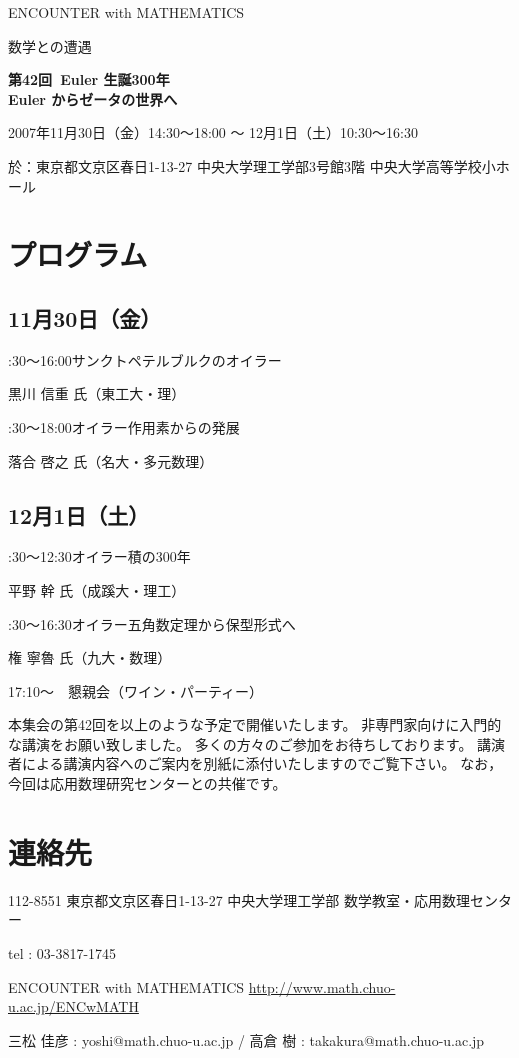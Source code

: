 \documentclass[uplatex,dvipdfmx]{jlreq}
\newcommand{\talk}[3]{%
\noindent
#1\quad #2\par
\hspace*{2em}#3\par\smallskip
}
\newcommand{\EwMnumber}{第42回}
\newcommand{\EwMtitle}{Euler 生誕300年\\[2mm]\large Euler からゼータの世界へ}
\newcommand{\EwMdate}{2007年11月30日（金）14:30～18:00 ～ 12月1日（土）10:30～16:30}
\newcommand{\EwMplace}{東京都文京区春日1-13-27 中央大学理工学部3号館3階 中央大学高等学校小ホール}
\newcommand{\EwMtitleblock}{
\vspace*{-5mm}
\begin{center}
{\Large ENCOUNTER with MATHEMATICS}

\vspace{2mm}
{\large 数学との遭遇}

\vspace{4mm}
{\Large \bfseries \EwMnumber\ \EwMtitle}

\vspace{4mm}
\EwMdate

\vspace{2mm}
於：\EwMplace
\end{center}

\vspace{2mm}
}
\begin{document}
\EwMtitleblock

\section*{プログラム}

\subsection*{11月30日（金）}

\talk
{14:30～16:00}
{サンクトペテルブルクのオイラー}
{黒川 信重 氏（東工大・理）}

\talk
{16:30～18:00}
{オイラー作用素からの発展}
{落合 啓之 氏（名大・多元数理）}

\subsection*{12月1日（土）}

\talk
{10:30～12:30}
{オイラー積の300年}
{平野 幹 氏（成蹊大・理工）}

\talk
{14:30～16:30}
{オイラー五角数定理から保型形式へ}
{権 寧魯 氏（九大・数理）}

\bigskip

17:10～　懇親会（ワイン・パーティー）

\bigskip

本集会の第42回を以上のような予定で開催いたします。  
非専門家向けに入門的な講演をお願い致しました。  
多くの方々のご参加をお待ちしております。  
講演者による講演内容へのご案内を別紙に添付いたしますのでご覧下さい。  
なお，今回は応用数理研究センターとの共催です。

\section*{連絡先}

112-8551 東京都文京区春日1-13-27  
中央大学理工学部 数学教室・応用数理センター  

tel : 03-3817-1745  

ENCOUNTER with MATHEMATICS  
\url{http://www.math.chuo-u.ac.jp/ENCwMATH}  

三松 佳彦 : yoshi@math.chuo-u.ac.jp / 高倉 樹 : takakura@math.chuo-u.ac.jp
\end{document}
